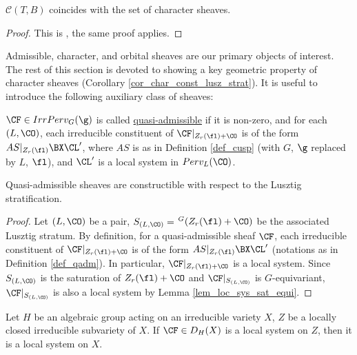\begin{proposition}\label{prop_char=Forb}
     $\mathcal{C}(T,B)$ coincides with the set of character sheaves.
\end{proposition}

\begin{proof}
    This is \cite[]{mirkovic_character_2004}, the same proof applies. 

\end{proof}

Admissible, character, and orbital sheaves are our primary objects of interest. The rest of this section is devoted to showing a key geometric property of character sheaves (Corollary \ref{cor_char_const_lusz_strat}). It is useful to introduce the following auxiliary class of sheaves:

\begin{definition}\label{def_qadm}
    $\CF\in IrrPerv_G(\g)$ is called \underline{quasi-admissible} if it is non-zero, and for each $(L,\CO)$, each irreducible constituent of $\CF|_{Z_r(\fl)+\CO}$ is of the form $AS|_{Z_r(\fl)}\BX\CL'$, where $AS$ is as in Definition \ref{def_cusp} (with $G$, $\g$ replaced by $L$, $\fl$), and $\CL'$ is a local system in $Perv_L(\CO)$.
\end{definition}

\begin{lemma}\label{lem_qadm_const_lusz_strat}
    Quasi-admissible sheaves are constructible with respect to the Lusztig stratification.
\end{lemma}

\begin{proof}
    Let $(L,\CO)$ be a pair, $S_{(L,\CO)}=$ $^G(Z_r(\fl)+\CO)$ be the associated Lusztig stratum. By definition, for a quasi-admissible sheaf $\CF$, each irreducible constituent of $\CF|_{Z_r(\fl)+\CO}$ is of the form $AS|_{Z_r(\fl)}\BX\CL'$ (notations as in Definition \ref{def_qadm}). In particular, $\CF|_{Z_r(\fl)+\CO}$ is a local system. Since $S_{(L,\CO)}$ is the saturation of $Z_r(\fl)+\CO$ and $\CF|_{S_{(L,\CO)}}$ is $G$-equivariant, $\CF|_{S_{(L,\CO)}}$ is also a local system by Lemma \ref{lem_loc_sys_sat_equi}.

\end{proof}

\begin{lemma}\label{lem_loc_sys_sat_equi}
    Let $H$ be an algebraic group acting on an irreducible variety $X$, $Z$ be a locally closed irreducible subvariety of $X$. If  $\CF\in D_H(X)$ is a local system on $Z$, then it is a local system on $X$.
\end{lemma}

